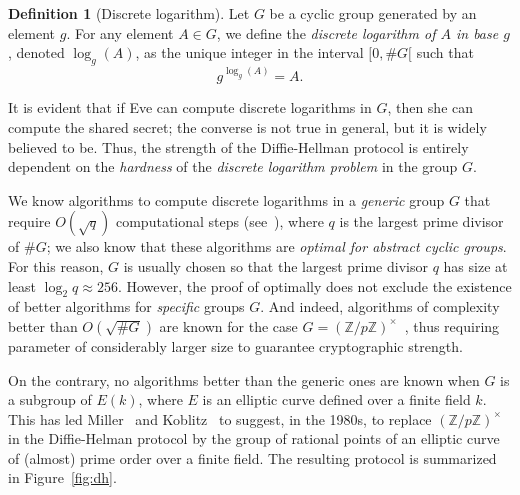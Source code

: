 \documentclass[10pt]{article}
\theoremstyle{plain}
\theoremstyle{definition}
\newtheorem{definition}[theorem]{Definition}
\begin{document}
\begin{definition}[Discrete logarithm]
  Let $G$ be a cyclic group generated by an element $g$. For any
  element $A∈G$, we define the \emph{discrete logarithm of $A$ in base
    $g$}, denoted $\log_g(A)$, as the unique integer in the interval
  $[0,\#G[$ such that
  \[g^{\log_g(A)} = A.\]
\end{definition}

It is evident that if Eve can compute discrete logarithms in $G$, then
she can compute the shared secret; the converse is not true in
general, but it is widely believed to be. %
Thus, the strength of the Diffie-Hellman protocol is entirely
dependent on the \emph{hardness} of the \emph{discrete logarithm
  problem} in the group $G$.

We know algorithms to compute discrete logarithms in a \emph{generic}
group $G$ that require $O(\sqrt{q})$ computational steps
(see~\cite{joux2009algorithmic}), where $q$ is the largest prime
divisor of $\#G$; we also know that these algorithms are \emph{optimal
  for abstract cyclic groups}. %
For this reason, $G$ is usually chosen so that the largest prime
divisor $q$ has size at least $\log_2 q ≈ 256$. %
However, the proof of optimally does not exclude the existence of
better algorithms for \emph{specific} groups $G$. %
And indeed, algorithms of complexity better than $O(\sqrt{\#G})$ are
known for the case $G=(ℤ/pℤ)^{×}$~\cite{joux2009algorithmic}, thus
requiring parameter of considerably larger size to guarantee
cryptographic strength.

On the contrary, no algorithms better than the generic ones are known
when $G$ is a subgroup of $E(k)$, where $E$ is an elliptic curve
defined over a finite field $k$. %
This has led Miller~\cite{miller86} and Koblitz~\cite{koblitz87} to
suggest, in the 1980s, to replace $(ℤ/pℤ)^{×}$ in the Diffie-Helman
protocol by the group of rational points of an elliptic curve of
(almost) prime order over a finite field. %
The resulting protocol is summarized in Figure~\ref{fig:dh}.
\end{document}
